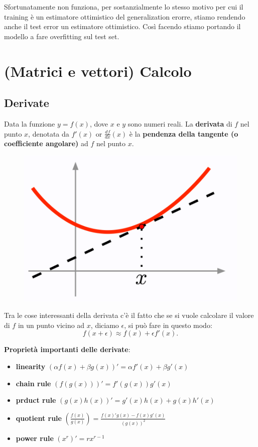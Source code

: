 Sfortunatamente non funziona, per sostanzialmente lo stesso motivo per cui il training è un estimatore ottimistico del generalization erorre, stiamo rendendo anche il test error un estimatore ottimistico. Così facendo stiamo portando il modello a fare overfitting sul test set.



\section{(Matrici e vettori) Calcolo}
\subsection{Derivate}
Data la funzione $y=f(x)$, dove $x$ e $y$ sono numeri reali.
La \textbf{derivata} di $f$ nel punto $x$, denotata da $f'(x)$ or $\frac{df}{dx}(x)$ è la \textbf{pendenza della tangente (o coefficiente angolare)} ad $f$ nel punto $x$.
\begin{figure}[h]
    \includegraphics[scale=0.5]{images/prerequisites/derivative.png}
    \centering
\end{figure}
Tra le cose interessanti della derivata c'è il fatto che se si vuole calcolare il valore di $f$ in un punto vicino ad $x$, diciamo $\epsilon$, si può fare in questo modo:
\begin{equation}
    f(x+\epsilon) \approx f(x)+\epsilon f'(x).
\end{equation}

\textbf{Proprietà importanti delle derivate}:
\begin{itemize}
    \item \textbf{linearity} $( \alpha f(x)+ \beta g(x))' = \alpha f'(x)+\beta g'(x)$
    \item \textbf{chain rule} $(f(g(x)))' = f'(g(x))g'(x)$
    \item \textbf{prduct rule} $(g(x)h(x))' = g'(x)h(x)+g(x)h'(x)$
    \item \textbf{quotient rule} $(\frac{f(x)}{g(x)}) = \frac{f(x)'g(x)-f(x)g'(x)}{(g(x))^2}$
    \item \textbf{power rule} $(x^r)' = rx^{r-1}$
\end{itemize}
\newpage
